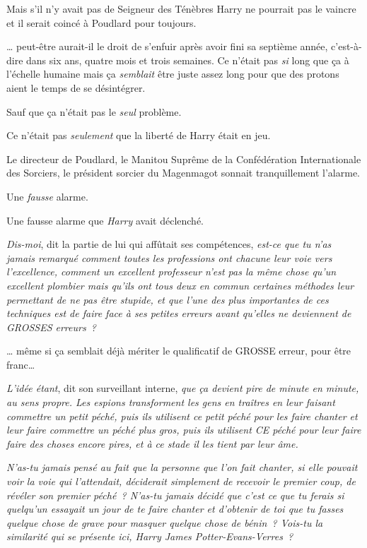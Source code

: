 Mais s'il n'y avait pas de Seigneur des Ténèbres Harry ne pourrait pas le vaincre et il serait coincé à Poudlard pour toujours.

… peut-être aurait-il le droit de s'enfuir après avoir fini sa septième année, c'est-à-dire dans six ans, quatre mois et trois semaines. Ce n'était pas \emph{si} long que ça à l'échelle humaine mais ça \emph{semblait} être juste assez long pour que des protons aient le temps de se désintégrer.

Sauf que ça n'était pas le \emph{seul} problème.

Ce n'était pas \emph{seulement} que la liberté de Harry était en jeu.

Le directeur de Poudlard, le Manitou Suprême de la Confédération Internationale des Sorciers, le président sorcier du Magenmagot sonnait tranquillement l'alarme.

Une \emph{fausse} alarme.

Une fausse alarme que \emph{Harry} avait déclenché.

\emph{Dis-moi}, dit la partie de lui qui affûtait ses compétences, \emph{est-ce que tu n'as jamais remarqué comment toutes les professions ont chacune leur voie vers l'excellence, comment un excellent professeur n'est pas la même chose qu'un excellent plombier mais qu'ils ont tous deux en commun certaines méthodes leur permettant de ne pas être stupide, et que l'une des plus importantes de ces techniques est de faire face à ses petites erreurs avant qu'elles ne deviennent de GROSSES erreurs~?}

… même si ça semblait déjà mériter le qualificatif de GROSSE erreur, pour être franc…

\emph{L'idée étant}, dit son surveillant interne, \emph{que ça devient pire de minute en minute, au sens propre. Les espions transforment les gens en traîtres en leur faisant commettre un petit péché, puis ils utilisent ce petit péché pour les faire chanter et leur faire commettre un péché plus gros, puis ils utilisent CE péché pour leur faire faire des choses encore pires, et à ce stade il les tient par leur âme.}

\emph{N'as-tu jamais pensé au fait que la personne que l'on fait chanter, si elle pouvait voir la voie qui l'attendait, déciderait simplement de recevoir le premier coup, de révéler son premier péché~? N'as-tu jamais décidé que c'est ce que tu ferais si quelqu'un essayait un jour de te faire chanter et d'obtenir de toi que tu fasses quelque chose de grave pour masquer quelque chose de bénin~? Vois-tu la similarité qui se présente ici, Harry James Potter-Evans-Verres~?}

